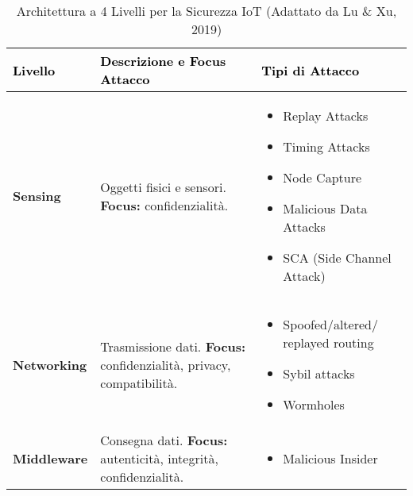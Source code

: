 \documentclass{article}
\begin{document}
\begin{table}[H]
\centering
\caption{Architettura a 4 Livelli per la Sicurezza IoT (Adattato da Lu \& Xu, 2019)}
\label{tab:iot_architecture}
\begin{tabular}{|p{}|p{}|p{}|}
\hline
\rowcolor{gray!15} %
\textcolor{black}{\textbf{Livello}} & \textcolor{black}{\textbf{Descrizione e Focus Attacco}} & \textcolor{black}{\textbf{Tipi di Attacco}} \\
\hline
\textbf{Sensing} & Oggetti fisici e sensori. \newline \textbf{Focus:} confidenzialità. &
    \begin{itemize}[nosep, leftmargin=*, itemsep=-2pt, before=\vspace{-0.5\baselineskip}, after=\vspace{-\baselineskip}]
        \item Replay Attacks
        \item Timing Attacks
        \item Node Capture
        \item Malicious Data Attacks
        \item SCA (Side Channel Attack)
    \end{itemize} \\
\hline
\textbf{Networking} & Trasmissione dati. \newline \textbf{Focus:} confidenzialità, privacy, compatibilità. &
    \begin{itemize}[nosep, leftmargin=*, itemsep=-2pt, before=\vspace{-0.5\baselineskip}, after=\vspace{-\baselineskip}]
        \item Spoofed/altered/ replayed routing
        \item Sybil attacks
        \item Wormholes
    \end{itemize} \\
\hline
\textbf{Middleware} & Consegna dati. \newline \textbf{Focus:} autenticità, integrità, confidenzialità. &
    \begin{itemize}[nosep, leftmargin=*, itemsep=-2pt, before=\vspace{-0.5\baselineskip}, after=\vspace{-\baselineskip}]
        \item Malicious Insider

\end{itemize}
\end{tabular}
\end{table}
\end{document}
